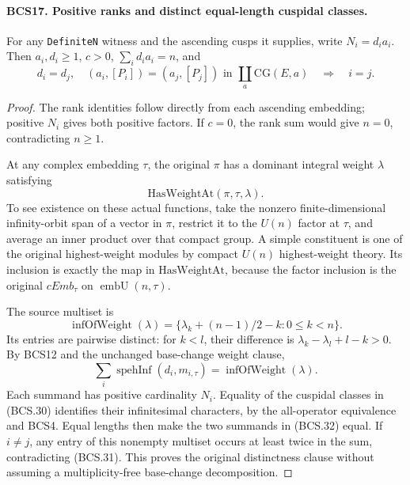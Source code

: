 \paragraph{BCS17. Positive ranks and distinct equal-length cuspidal classes.}
\label{claim:BCS17}
For any \texttt{DefiniteN} witness and the ascending cusps it
supplies, write \(N_i=d_i a_i\).  Then \(a_i,d_i\ge1\),
\(c>0\), \(\sum_i d_i a_i=n\), and
\[
 d_i=d_j,\quad
 (a_i,[P_i])=(a_j,[P_j])\text{ in }\coprod_a\mathrm{CG}(E,a)
                         \quad\Longrightarrow\quad i=j.
 \tag{BCS.30}
\]
\begin{proof}
The rank identities follow directly from each ascending embedding;
positive \(N_i\) gives both positive factors.  If \(c=0\), the
rank sum would give \(n=0\), contradicting \(n\ge1\).

At any complex embedding \(\tau\), the original \(\pi\) has a
dominant integral weight \(\lambda\) satisfying
\[
                    \mathrm{HasWeightAt}(\pi,\tau,\lambda).
\]
To see existence
on these actual functions, take the nonzero finite-dimensional
infinity-orbit span of a vector in \(\pi\), restrict it to the
\(U(n)\) factor at \(\tau\), and average an inner product over
that compact group.  A simple constituent is one of the original
highest-weight modules by compact \(U(n)\) highest-weight theory.
Its inclusion is exactly the map in \(\mathrm{HasWeightAt}\),
because the factor inclusion is the original \(cEmb_\tau\)
on \(\operatorname{embU}(n,\tau)\).

The source multiset is
\[
 \operatorname{infOfWeight}(\lambda)=
       \{\lambda_k+(n-1)/2-k:0\le k<n\}.
 \tag{BCS.31}
\]
Its entries are pairwise distinct: for \(k<l\), their difference
is \(\lambda_k-\lambda_l+l-k>0\).  By BCS12 and the unchanged
base-change weight clause,
\[
 \sum_i\operatorname{spehInf}(d_i,m_{i,\tau})
                           =\operatorname{infOfWeight}(\lambda).
 \tag{BCS.32}
\]
Each summand has positive cardinality \(N_i\).  Equality of the
cuspidal classes in (BCS.30) identifies their infinitesimal
characters, by the all-operator equivalence and BCS4.  Equal lengths
then make the two summands in (BCS.32) equal.  If \(i\ne j\),
any entry of this nonempty multiset occurs at least twice in the
sum, contradicting (BCS.31).  This proves the original distinctness
clause without assuming a multiplicity-free base-change decomposition.
\end{proof}

